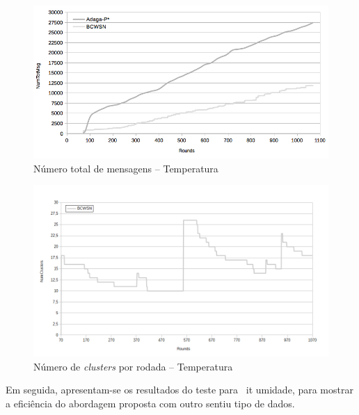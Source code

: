 \documentclass{acm_proc_article-sp}
\begin{document}
\begin{figure}[!htb]
\begin{center}
	\includegraphics[scale=0.30]{BCWSN-TotNumMsgxRound-PB-Temp.png}
	 \vspace*{-.6cm}
	\caption{Número total de mensagens – Temperatura}
    \label{fig:tot-num-msg}
\end{center}
\end{figure}
\vspace*{-.3cm}

\begin{figure}[!htb]
\begin{center}
	\includegraphics[scale=0.32]{BCWSN-NumClustersxRound-PB.png}
	 \vspace*{-.6cm}
	\caption{Número de {\it clusters} por rodada – Temperatura}
    \label{fig:num-clts}
\end{center}
\end{figure}

Em seguida, apresentam-se os resultados do teste para {\ it umidade}, para mostrar a eficiência do 
abordagem proposta com outro sentiu tipo de dados.
\vspace*{-.3cm}
\end{document}
